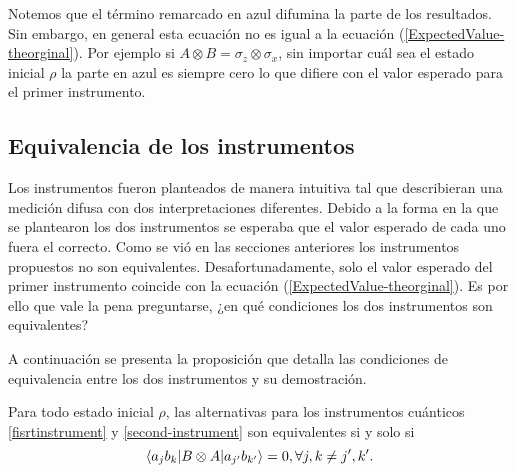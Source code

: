 Notemos que el término remarcado en azul difumina la parte de los resultados. Sin embargo, en general esta ecuación no es igual a la ecuación ({\ref{ExpectedValue-theorginal}}). Por ejemplo si $A\otimes B= \sigma_z\otimes \sigma_x$, sin importar cuál sea el estado inicial $\rho$ la parte en azul es siempre cero lo que difiere con el valor esperado para el primer instrumento. 



\subsection{Equivalencia de los instrumentos}
Los instrumentos fueron planteados de manera intuitiva tal que describieran una medición difusa con dos interpretaciones diferentes. Debido a la forma en la que se plantearon los dos instrumentos se esperaba que el valor esperado de cada uno fuera el correcto. Como se vió en las secciones anteriores los instrumentos propuestos no son equivalentes. Desafortunadamente, solo el valor esperado del primer instrumento coincide con la ecuación ({\ref{ExpectedValue-theorginal}}). Es por ello que vale la pena preguntarse, ¿en qué condiciones los dos instrumentos son equivalentes?


A continuación se presenta la proposición que detalla las condiciones de equivalencia entre los dos instrumentos y su demostración.

\begin{proposition}\label{prop:Equivalencia-instruments}
    Para todo estado inicial $\rho$, las alternativas para los instrumentos cuánticos {\ref{fisrtinstrument}} y {\ref{second-instrument}} son equivalentes si y solo si \[\langle a_j b_k|B\otimes A|a_{j'}b_{k'}\rangle=0, \forall j,k\ne j',k'.\] 
\end{proposition}

